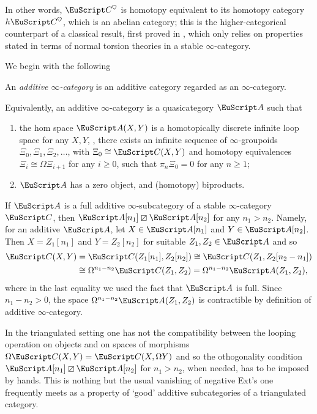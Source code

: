 In other words, $\C^\heart$ is homotopy equivalent to its homotopy category $h\C^\heart$, which is an abelian category; this is the higher-categorical counterpart of a classical result, first proved in \cite[\athm\textbf{1.3.6}]{BBDPervers}, 
which 
only relies on properties stated in terms of normal torsion theories in a stable $\infty$-category. 
{\color{green!40!black}
We begin with the following
\begin{definition}\label{df:additive}
An \emph{additive $\infty$-category}  is an additive
category regarded as an $\infty$-category.
\end{definition}
\begin{remark}
Equivalently, an additive $\infty$-category is a quasicategory $\cate{A}$
such that
\begin{enumerate}[label=$\roman*$)]
\item the hom space $\cate{A}(X,Y)$ is a homotopically discrete infinite loop space for any $X, Y$, \ie, there exists an infinite sequence of $\infty$-groupoids $\Xi_0, \Xi_1,\Xi_2,\dots$, with $\Xi_0\cong \C(X,Y)$ and homotopy equivalences $\Xi_i\cong \Omega \Xi_{i+1}$ for any $i\geq 0$, such that $\pi_n \Xi_0=0$ for any $n\geq 1$;
\item $\cate{A}$ has a zero object, and (homotopy) biproducts.
\end{enumerate}
\end{remark}
\begin{remark}\label{orthogonality-of-a}
If $\cA$ is a full additive $\infty$-subcategory of a stable $\infty$-category $\C$, then $\cA[n_1]\orth\cA[n_2]$ for any $n_1>n_2$. Namely, for an additive $\cA$, let $X\in \cA[n_1]$ and $Y\in\cA[n_2]$. Then $X=Z_1[n_1]$ and $Y=Z_2[n_2]$ for suitable $Z_1,Z_2\in \cA$ and so 
\begin{align*}
\C(X,Y)&=\C(Z_1[n_1],Z_2[n_2])\cong  \C(Z_1,Z_2[n_2-n_1])\\
&\cong \Omega^{n_1-n_2}\C(Z_1,Z_2)=\Omega^{n_1-n_2}\cA(Z_1,Z_2),
\end{align*}
where in the last equality we used the fact that $\cA$ is full. Since $n_1-n_2>0$, the space $\Omega^{n_1-n_2}\cA(Z_1,Z_2)$ is contractible by definition of additive $\infty$-category.
\end{remark}
\begin{remark}
In the triangulated setting one has not the compatibility between the looping operation on objects and on spaces of morphisms $\Omega\C(X,Y)=\C(X,\Omega Y)$ and so the othogonality condition $\cA[n_1]\orth\cA[n_2]$ for $n_1>n_2$, when needed, has to be imposed by hands. This is nothing but the usual vanishing of negative Ext's one frequently meets as a property of `good' additive subcategories of a triangulated category.  
\end{remark}

}
